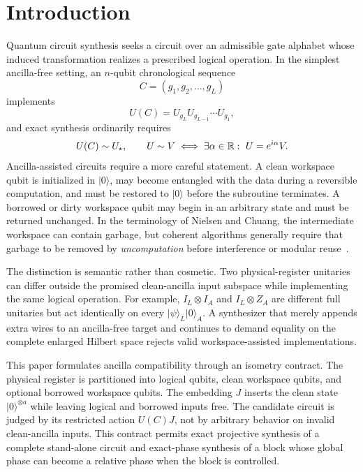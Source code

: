 \section{Introduction}

Quantum circuit synthesis seeks a circuit over an admissible gate alphabet whose induced transformation realizes a prescribed logical operation. In the simplest ancilla-free setting, an $n$-qubit chronological sequence
\begin{equation}
C=(g_1,g_2,\ldots,g_L)
\end{equation}
implements
\begin{equation}
U(C)=U_{g_L}U_{g_{L-1}}\cdots U_{g_1},
\label{eq:chronological}
\end{equation}
and exact synthesis ordinarily requires
\begin{equation}
U(C)\mathrel{\sim} U_\star,
\qquad
U\mathrel{\sim} V\iff \exists\alpha\in\mathbb R:\ U=e^{i\alpha}V.
\label{eq:projective}
\end{equation}
Ancilla-assisted circuits require a more careful statement. A clean workspace qubit is initialized in $\lvert0\rangle$, may become entangled with the data during a reversible computation, and must be restored to $\lvert0\rangle$ before the subroutine terminates. A borrowed or dirty workspace qubit may begin in an arbitrary state and must be returned unchanged. In the terminology of Nielsen and Chuang, the intermediate workspace can contain garbage, but coherent algorithms generally require that garbage to be removed by \emph{uncomputation} before interference or modular reuse~\cite{nielsen2010quantum}.

The distinction is semantic rather than cosmetic. Two physical-register unitaries can differ outside the promised clean-ancilla input subspace while implementing the same logical operation. For example, $I_L\otimes I_A$ and $I_L\otimes Z_A$ are different full unitaries but act identically on every $\lvert\psi\rangle_L\lvert0\rangle_A$. A synthesizer that merely appends extra wires to an ancilla-free target and continues to demand equality on the complete enlarged Hilbert space rejects valid workspace-assisted implementations.

This paper formulates ancilla compatibility through an isometry contract. The physical register is partitioned into logical qubits, clean workspace qubits, and optional borrowed workspace qubits. The embedding $J$ inserts the clean state $\lvert0\rangle^{\otimes a}$ while leaving logical and borrowed inputs free. The candidate circuit is judged by its restricted action $U(C)J$, not by arbitrary behavior on invalid clean-ancilla inputs. This contract permits exact projective synthesis of a complete stand-alone circuit and exact-phase synthesis of a block whose global phase can become a relative phase when the block is controlled.

